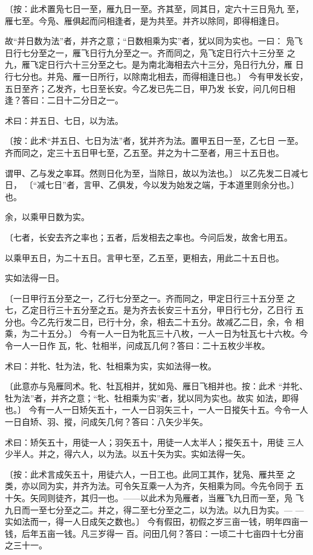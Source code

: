 \documentclass[a4paper,12pt,UTF8,twoside]{ctexbook}
\begin{document}
〔按：此术置凫七日一至，雁九日一至。齐其至，同其日，定六十三日凫九 至，雁七至。今凫、雁俱起而问相逢者，是为共至。并齐以除同，即得相逢日。

故“并日数为法”者，并齐之意；“日数相乘为实”者，犹以同为实也。一曰： 凫飞日行七分至之一，雁飞日行九分至之一。齐而同之，凫飞定日行六十三分至 之九，雁飞定日行六十三分至之七。是为南北海相去六十三分，凫日行九分，雁 日行七分也。并凫、雁一日所行，以除南北相去，而得相逢日也。〕 今有甲发长安，五日至齐；乙发齐，七日至长安。今乙发已先二日，甲乃发 长安，问几何日相逢？答曰：二日十二分日之一。

术曰：并五日、七日，以为法。

〔按：此术“并五日、七日为法”者，犹并齐为法。置甲五日一至，乙七日 一至。齐而同之，定三十五日甲七至，乙五至。并之为十二至者，用三十五日也。

谓甲、乙与发之率耳。然则日化为至，当除日，故以为法也。〕 以乙先发二日减七日， 〔“减七日”者，言甲、乙俱发，今以发为始发之端，于本道里则余分也。〕 也。

余，以乘甲日数为实。

〔七者，长安去齐之率也；五者，后发相去之率也。今问后发，故舍七用五。

以乘甲五日，为二十五日。言甲七至，乙五至，更相去，用此二十五日也。

实如法得一日。

〔一日甲行五分至之一，乙行七分至之一。齐而同之，甲定日行三十五分至 之七，乙定日行三十五分至之五。是为齐去长安三十五分，甲日行七分，乙日行 五分也。今乙先行发二日，已行十分，余，相去二十五分。故减乙二日，余，令 相乘，为二十五分。〕 今有一人一日为牝瓦三十八枚，一人一日为牡瓦七十六枚。今令一人一日作 瓦，牝、牡相半，问成瓦几何？答曰：二十五枚少半枚。

术曰：并牝、牡为法，牝、牡相乘为实，实如法得一枚。

〔此意亦与凫雁同术。牝、牡瓦相并，犹如凫、雁日飞相并也。按：此术 “并牝、牡为法”者，并齐之意；“牝、牡相乘为实”者，犹以同为实也。故实 如法，即得也。〕 今有一人一日矫矢五十，一人一日羽矢三十，一人一日摐矢十五。今令一人 一日自矫、羽、摐，问成矢几何？答曰：八矢少半矢。

术曰：矫矢五十，用徒一人；羽矢五十，用徒一人太半人；摐矢五十，用徒 三人少半人。并之，得六人，以为法。以五十矢为实。实如法得一矢。

〔按：此术言成矢五十，用徒六人，一日工也。此同工其作，犹凫、雁共至 之类，亦以同为实，并齐为法。可令矢互乘一人为齐，矢相乘为同。今先令同于 五十矢。矢同则徒齐，其归一也。——以此术为凫雁者，当雁飞九日而一至，凫 飞九日而一至七分至之二。并之，得二至七分至之二，以为法。以九日为实。— —实如法而一，得一人日成矢之数也。〕 今有假田，初假之岁三亩一钱，明年四亩一钱，后年五亩一钱。凡三岁得一 百。问田几何？答曰：一顷二十七亩四十七分亩之三十一。
\end{document}
